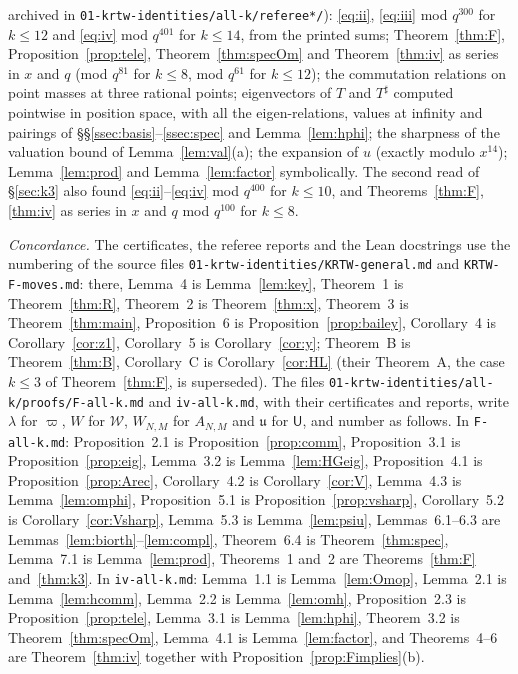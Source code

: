 \documentclass[11pt]{amsart}
\theoremstyle{definition}
\numberwithin{equation}{section}
\newcommand{\fpath}[1]{\nolinkurl{#1}}
\begin{document}
\begin{itemize}[leftmargin=1.5em]
archived in \fpath{01-krtw-identities/all-k/referee*/}): \eqref{eq:ii}, \eqref{eq:iii} mod $q^{300}$ for $k\le12$ and
\eqref{eq:iv} mod $q^{401}$ for $k\le14$, from the printed sums; Theorem~\ref{thm:F}, Proposition~\ref{prop:tele},
Theorem~\ref{thm:specOm} and Theorem~\ref{thm:iv} as series in $x$ and $q$ (mod $q^{81}$ for $k\le8$, mod
$q^{61}$ for $k\le12$); the commutation relations on point masses at three rational points; eigenvectors of $T$
and $T^\sharp$ computed pointwise in position space, with all the eigen-relations, values at infinity and
pairings of §§\ref{ssec:basis}--\ref{ssec:spec} and Lemma~\ref{lem:hphi}; the sharpness of the valuation bound of
Lemma~\ref{lem:val}(a); the expansion of $u$ (exactly modulo $x^{14}$); Lemma~\ref{lem:prod} and Lemma~\ref{lem:factor}
symbolically. The second read of §\ref{sec:k3} also found \eqref{eq:ii}--\eqref{eq:iv} mod $q^{400}$ for $k\le10$, and
Theorems~\ref{thm:F}, \ref{thm:iv} as series in $x$ and $q$ mod $q^{100}$ for $k\le8$.
\end{itemize}

\emph{Concordance.} The certificates, the referee reports and the Lean docstrings use the numbering of the
source files \fpath{01-krtw-identities/KRTW-general.md} and \fpath{KRTW-F-moves.md}: there, Lemma~4 is
Lemma~\ref{lem:key}, Theorem~1 is Theorem~\ref{thm:R}, Theorem~2 is Theorem~\ref{thm:x}, Theorem~3 is
Theorem~\ref{thm:main}, Proposition~6 is Proposition~\ref{prop:bailey}, Corollary~4 is
Corollary~\ref{cor:z1}, Corollary~5 is Corollary~\ref{cor:y}; Theorem~B is Theorem~\ref{thm:B}, Corollary~C is
Corollary~\ref{cor:HL} (their Theorem~A, the case $k\le3$ of Theorem~\ref{thm:F}, is superseded). The files
\fpath{01-krtw-identities/all-k/proofs/F-all-k.md} and \fpath{iv-all-k.md}, with their certificates and reports, write $\lambda$
for $\varpi$, $W$ for $\mathcal W$, $W_{N,M}$ for $A_{N,M}$ and $\mathfrak u$ for $\mathsf U$, and number as follows. In
\fpath{F-all-k.md}: Proposition~2.1 is Proposition~\ref{prop:comm}, Proposition~3.1 is Proposition~\ref{prop:eig},
Lemma~3.2 is Lemma~\ref{lem:HGeig}, Proposition~4.1 is Proposition~\ref{prop:Arec}, Corollary~4.2 is
Corollary~\ref{cor:V}, Lemma~4.3 is Lemma~\ref{lem:omphi}, Proposition~5.1 is Proposition~\ref{prop:vsharp},
Corollary~5.2 is Corollary~\ref{cor:Vsharp}, Lemma~5.3 is Lemma~\ref{lem:psiu}, Lemmas~6.1--6.3 are
Lemmas~\ref{lem:biorth}--\ref{lem:compl}, Theorem~6.4 is Theorem~\ref{thm:spec}, Lemma~7.1 is Lemma~\ref{lem:prod},
Theorems~1 and~2 are Theorems~\ref{thm:F} and~\ref{thm:k3}. In \fpath{iv-all-k.md}: Lemma~1.1 is
Lemma~\ref{lem:Omop}, Lemma~2.1 is Lemma~\ref{lem:hcomm}, Lemma~2.2 is Lemma~\ref{lem:omh}, Proposition~2.3 is
Proposition~\ref{prop:tele}, Lemma~3.1 is Lemma~\ref{lem:hphi}, Theorem~3.2 is Theorem~\ref{thm:specOm}, Lemma~4.1 is
Lemma~\ref{lem:factor}, and Theorems~4--6 are Theorem~\ref{thm:iv} together with Proposition~\ref{prop:Fimplies}(b).
\end{document}
